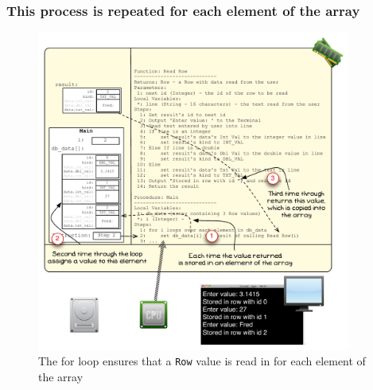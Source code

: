 
\clearpage
\subsubsection{This process is repeated for each element of the array} %
\label{ssub:this_process_is_repeated_for_each_element_of_the_array}

\begin{figure}[htbp]
   \centering
   \includegraphics[width=0.92\textwidth]{./topics/type-decl/images/ReadRow7} 
 \caption{The for loop ensures that a \texttt{Row} value is read in for each element of the array}
 \label{fig:read-row-vis-7}
\end{figure}

